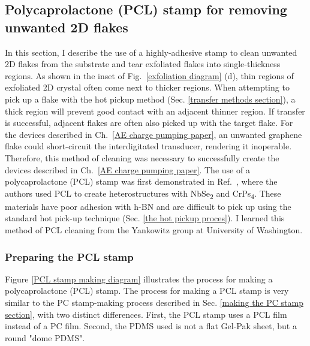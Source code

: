 \documentclass[double,12pt,1in,seploa]{beavtex}
\let\Oldsubsection\subsection
\renewcommand{\subsection}{\FloatBarrier\Oldsubsection}
\let\Oldsubsubsection\subsubsection
\renewcommand{\subsubsection}{\FloatBarrier\Oldsubsubsection}
\begin{document}
\subsection{Polycaprolactone (PCL) stamp for removing unwanted 2D flakes}
In this section, I describe the use of a highly-adhesive stamp to clean unwanted 2D flakes from the substrate and tear exfoliated flakes into single-thickness regions. As shown in the inset of Fig.\ \ref{exfoliation diagram} (d), thin regions of exfoliated 2D crystal often come next to thicker regions. When attempting to pick up a flake with the hot pickup method (Sec. \ref{transfer methods section}), a thick region will prevent good contact with an adjacent thinner region. If transfer is successful, adjacent flakes are often also picked up with the target flake. For the devices described in Ch.\ \ref{AE charge pumping paper}, an unwanted graphene flake could short-circuit the interdigitated transducer, rendering it inoperable. Therefore, this method of cleaning was necessary to successfully create the devices described in Ch.\ \ref{AE charge pumping paper}. The use of a polycaprolactone (PCL) stamp was first demonstrated in Ref.\ \cite{son_strongly_2020}, where the authors used PCL to create heterostructures with NbSe\textsubscript{2} and CrPs\textsubscript{4}. These materials have poor adhesion with h-BN and are difficult to pick up using the standard hot pick-up technique (Sec. \ref{the hot pickup proces}). I learned this method of PCL cleaning from the Yankowitz group at University of Washington.

\subsubsection{Preparing the PCL stamp}


Figure \ref{PCL stamp making diagram} illustrates the process for making a polycaprolactone (PCL) stamp. The process for making a PCL stamp is very similar to the PC stamp-making process described in Sec. \ref{making the PC stamp section}, with two distinct differences. First, the PCL stamp uses a PCL film instead of a PC film. Second, the PDMS used is not a flat Gel-Pak sheet, but a round "dome PDMS". 
\end{document}
